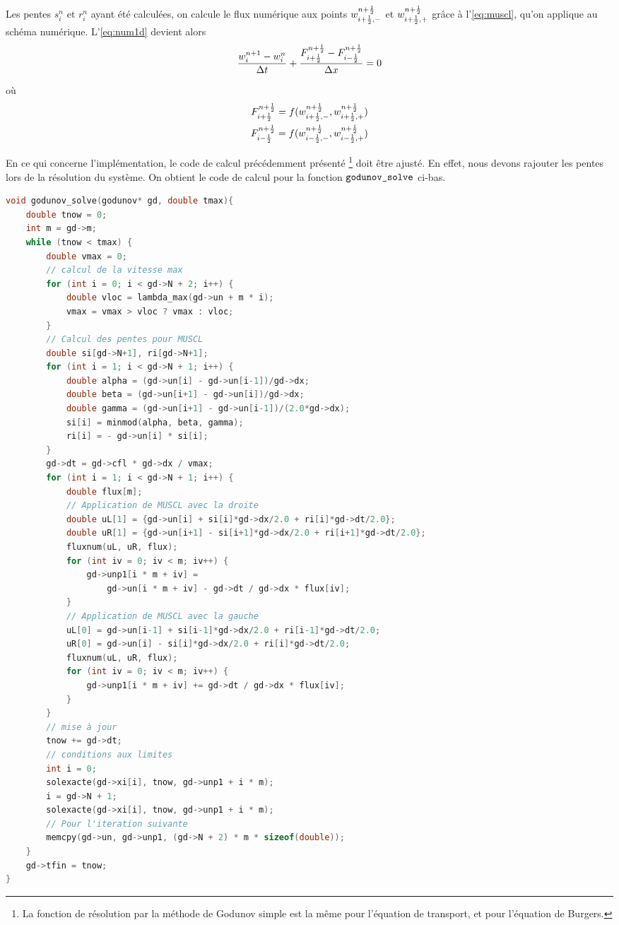 \documentclass[
	french,
	11pt, %
]{fphw}
\begin{document}
Les pentes $s^n_{i}$ et $r^n_i$ ayant été calculées, on calcule le flux numérique aux points $w^{n+\frac{1}{2}}_{i+\frac{1}{2},-}$ et $w^{n+\frac{1}{2}}_{i+\frac{1}{2},+}$ grâce à l'\cref{eq:muscl}, qu'on applique au schéma numérique. L'\cref{eq:num1d} devient alors
\begin{align}
	\frac{w^{n+1}_i - w^n_i}{\Delta t} +  \frac{F^{n+\frac{1}{2}}_{i+\frac{1}{2}} - F^{n+\frac{1}{2}}_{i-\frac{1}{2}}}{\Delta x} = 0
\end{align}

où
\begin{align*}
	F^{n+\frac{1}{2}}_{i+\frac{1}{2}} = f(w^{n+\frac{1}{2}}_{i+\frac{1}{2},-}, w^{n+\frac{1}{2}}_{i+\frac{1}{2},+}) \\
	F^{n+\frac{1}{2}}_{i-\frac{1}{2}} = f(w^{n+\frac{1}{2}}_{i-\frac{1}{2},-}, w^{n+\frac{1}{2}}_{i-\frac{1}{2},+}) 
\end{align*}


En ce qui concerne l'implémentation, le code de calcul précédemment présenté \footnote{La fonction de résolution par la méthode de Godunov simple est la même pour l'équation de transport, et pour l'équation de Burgers.} doit être ajusté. En effet, nous devons rajouter les pentes lors de la résolution du système. On obtient le code de calcul pour la fonction $\verb|godunov_solve|$ ci-bas.

\begin{lstlisting}[language=C, caption={Fonction de résolution du problème de Burger par un schéma de Godunov, auquel on applique la correction MUSCL},breaklines]
void godunov_solve(godunov* gd, double tmax){
	double tnow = 0;
	int m = gd->m;
	while (tnow < tmax) {
		double vmax = 0;
		// calcul de la vitesse max
		for (int i = 0; i < gd->N + 2; i++) {
			double vloc = lambda_max(gd->un + m * i);
			vmax = vmax > vloc ? vmax : vloc;
		}
		// Calcul des pentes pour MUSCL
		double si[gd->N+1], ri[gd->N+1];
		for (int i = 1; i < gd->N + 1; i++) {
			double alpha = (gd->un[i] - gd->un[i-1])/gd->dx;
			double beta = (gd->un[i+1] - gd->un[i])/gd->dx;
			double gamma = (gd->un[i+1] - gd->un[i-1])/(2.0*gd->dx);
			si[i] = minmod(alpha, beta, gamma);
			ri[i] = - gd->un[i] * si[i];
		}
		gd->dt = gd->cfl * gd->dx / vmax;
		for (int i = 1; i < gd->N + 1; i++) {
			double flux[m];
			// Application de MUSCL avec la droite
			double uL[1] = {gd->un[i] + si[i]*gd->dx/2.0 + ri[i]*gd->dt/2.0};
			double uR[1] = {gd->un[i+1] - si[i+1]*gd->dx/2.0 + ri[i+1]*gd->dt/2.0};
			fluxnum(uL, uR, flux);
			for (int iv = 0; iv < m; iv++) {
				gd->unp1[i * m + iv] =
					gd->un[i * m + iv] - gd->dt / gd->dx * flux[iv];
			}
			// Application de MUSCL avec la gauche
			uL[0] = gd->un[i-1] + si[i-1]*gd->dx/2.0 + ri[i-1]*gd->dt/2.0;
			uR[0] = gd->un[i] - si[i]*gd->dx/2.0 + ri[i]*gd->dt/2.0;
			fluxnum(uL, uR, flux);
			for (int iv = 0; iv < m; iv++) {
				gd->unp1[i * m + iv] += gd->dt / gd->dx * flux[iv];
			}
		}
		// mise à jour
		tnow += gd->dt;
		// conditions aux limites
		int i = 0;
		solexacte(gd->xi[i], tnow, gd->unp1 + i * m);
		i = gd->N + 1;
		solexacte(gd->xi[i], tnow, gd->unp1 + i * m);
		// Pour l'iteration suivante
		memcpy(gd->un, gd->unp1, (gd->N + 2) * m * sizeof(double));
	}
	gd->tfin = tnow;
}	
\end{lstlisting}
\end{document}
